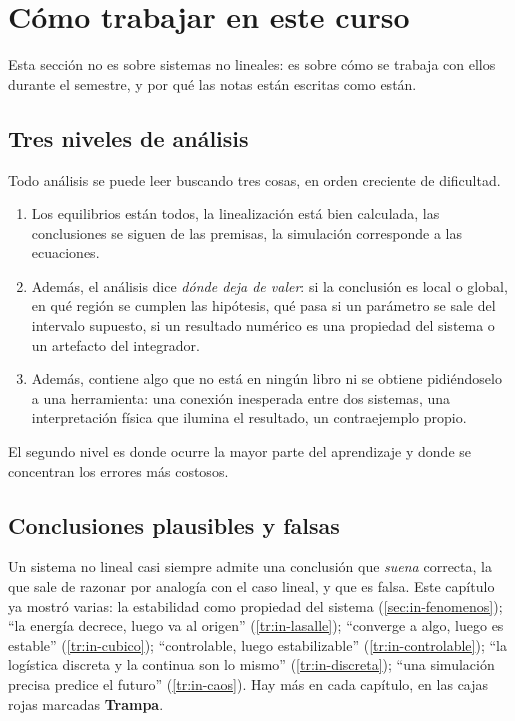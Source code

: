 \section{Cómo trabajar en este curso}
\label{sec:in-trabajo}

Esta sección no es sobre sistemas no lineales: es sobre cómo se trabaja con ellos durante el semestre, y por qué las notas están escritas como están.

\subsection{Tres niveles de análisis}

Todo análisis se puede leer buscando tres cosas, en orden creciente de dificultad.
\begin{enumerate}
  \item {} Los equilibrios están todos, la linealización está bien calculada, las conclusiones se siguen de las premisas, la simulación corresponde a las ecuaciones.
  \item {} Además, el análisis dice \emph{dónde deja de valer}: si la conclusión es local o global, en qué región se cumplen las hipótesis, qué pasa si un parámetro se sale del intervalo supuesto, si un resultado numérico es una propiedad del sistema o un artefacto del integrador.
  \item {} Además, contiene algo que no está en ningún libro ni se obtiene pidiéndoselo a una herramienta: una conexión inesperada entre dos sistemas, una interpretación física que ilumina el resultado, un contraejemplo propio.
\end{enumerate}
El segundo nivel es donde ocurre la mayor parte del aprendizaje y donde se concentran los errores más costosos.

\subsection{Conclusiones plausibles y falsas}

Un sistema no lineal casi siempre admite una conclusión que \emph{suena} correcta, la que sale de razonar por analogía con el caso lineal, y que es falsa. Este capítulo ya mostró varias: la estabilidad como propiedad del sistema (\cref{sec:in-fenomenos}); ``la energía decrece, luego va al origen'' (\cref{tr:in-lasalle}); ``converge a algo, luego es estable'' (\cref{tr:in-cubico}); ``controlable, luego estabilizable'' (\cref{tr:in-controlable}); ``la logística discreta y la continua son lo mismo'' (\cref{tr:in-discreta}); ``una simulación precisa predice el futuro'' (\cref{tr:in-caos}). Hay más en cada capítulo, en las cajas rojas marcadas \textbf{Trampa}.

